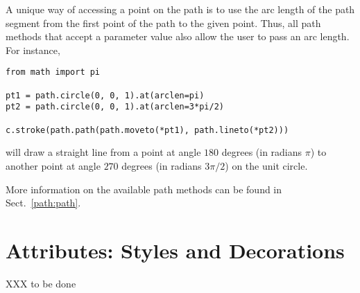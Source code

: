 A unique way of accessing a point on the path is to use the arc length
of the path segment from the first point of the path to the given
point. Thus, all \PyX{} path methods that accept a parameter value
also allow the user to pass an arc length. For instance, 
\begin{verbatim}
from math import pi

pt1 = path.circle(0, 0, 1).at(arclen=pi)
pt2 = path.circle(0, 0, 1).at(arclen=3*pi/2)

c.stroke(path.path(path.moveto(*pt1), path.lineto(*pt2)))
\end{verbatim}
will draw a straight line from a point at angle $180$ degrees (in
radians $\pi$) to another point at angle $270$ degrees (in radians
$3\pi/2$) on the unit circle.

More information on the available path methods can be found 
in Sect.~\ref{path:path}.

\section{Attributes: Styles and Decorations}

XXX to be done
